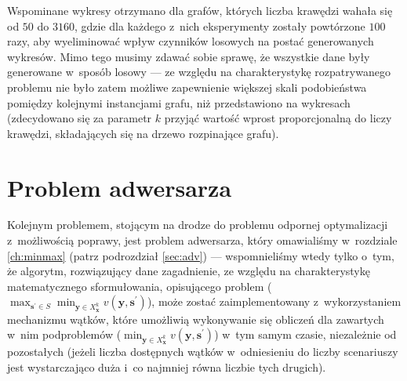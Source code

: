 Wspominane wykresy otrzymano dla grafów, których liczba krawędzi wahała się od $50$ do $3160$, gdzie dla każdego z~nich eksperymenty zostały powtórzone $100$ razy, aby wyeliminować wpływ czynników losowych na postać generowanych wykresów. Mimo tego musimy zdawać sobie sprawę, że wszystkie dane były generowane w~sposób losowy --- ze względu na charakterystykę rozpatrywanego problemu nie było zatem możliwe zapewnienie większej skali podobieństwa pomiędzy kolejnymi instancjami grafu, niż przedstawiono na wykresach (zdecydowano się za parametr $k$ przyjąć wartość wprost proporcjonalną do liczy krawędzi, składających się na drzewo rozpinające grafu).

\section{Problem adwersarza}

Kolejnym problemem, stojącym na drodze do problemu odpornej optymalizacji z~możliwością poprawy, jest problem adwersarza, który omawialiśmy w~rozdziale \ref{ch:minmax} (patrz podrozdział \ref{sec:adv}) --- wspomnieliśmy wtedy tylko o~tym, że algorytm, rozwiązujący dane zagadnienie, ze względu na charakterystykę matematycznego sformułowania, opisującego problem ($\max_{\textbf{s}^{\prime} \in S} \min_{\textbf{y} \in X^{k}_{\textbf{x}}} v \left( \textbf{y}, \textbf{s}^{\prime} \right)$), może zostać zaimplementowany z~wykorzystaniem mechanizmu wątków, które umożliwią wykonywanie się obliczeń dla zawartych w~nim podproblemów ($\min_{\textbf{y} \in X^{k}_{\textbf{x}}} v \left( \textbf{y}, \textbf{s}^{\prime} \right)$) w~tym samym czasie, niezależnie od pozostałych (jeżeli liczba dostępnych wątków w~odniesieniu do liczby scenariuszy jest wystarczająco duża i~co najmniej równa liczbie tych drugich). 

